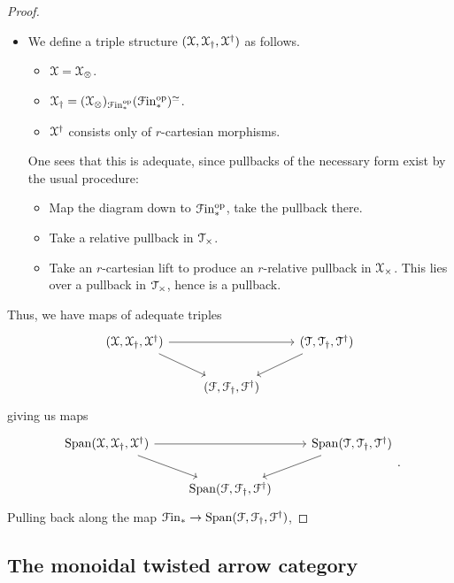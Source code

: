 \documentclass[main.tex]{subfiles}
\begin{document}
\begin{proof}
\begin{itemize}
    \item We define a triple structure $(\mathcal{X}, \mathcal{X}_{\dagger}, \mathcal{X}^{\dagger})$ as follows.
      \begin{itemize}
        \item $\mathcal{X} = \mathcal{X}_{\otimes}$.

        \item $\mathcal{X}_{\dagger} = (\mathcal{X}_{\otimes})_{\mathcal{F}\mathrm{in}_{*}^{\mathrm{op}}}(\mathcal{F}\mathrm{in}_{*}^{\mathrm{op}})^{\simeq}$.

        \item $\mathcal{X}^{\dagger}$ consists only of $r$-cartesian morphisms.
      \end{itemize}

      One sees that this is adequate, since pullbacks of the necessary form exist by the usual procedure:
      \begin{itemize}
        \item Map the diagram down to $\mathcal{F}\mathrm{in}_{*}^{\mathrm{op}}$, take the pullback there.

        \item Take a relative pullback in $\mathcal{T}_{\times}$.

        \item Take an $r$-cartesian lift to produce an $r$-relative pullback in $\mathcal{X}_{\times}$. This lies over a pullback in $\mathcal{T}_{\times}$, hence is a pullback.
      \end{itemize}
  \end{itemize}

  Thus, we have maps of adequate triples
  \begin{equation*}
    \begin{tikzcd}
      \triple{X}
      \arrow[rr]
      \arrow[dr]
      && \triple{T}
      \arrow[dl]
      \\
      & \triple{F}
    \end{tikzcd}
  \end{equation*}
  giving us maps
  \begin{equation*}
    \begin{tikzcd}
      \Span\triple{X}
      \arrow[rr]
      \arrow[dr]
      && \Span\triple{T}
      \arrow[dl]
      \\
      & \Span\triple{F}
    \end{tikzcd}.
  \end{equation*}
  Pulling back along the map $\mathcal{F}\mathrm{in}_{*} \to \mathrm{Span}(\mathcal{F}, \mathcal{F}_{\dagger}, \mathcal{F}^{\dagger})$,
\end{proof}


\subsection{The monoidal twisted arrow category}
\label{ssc:the_monoidal_twisted_arrow_category}
\end{document}
